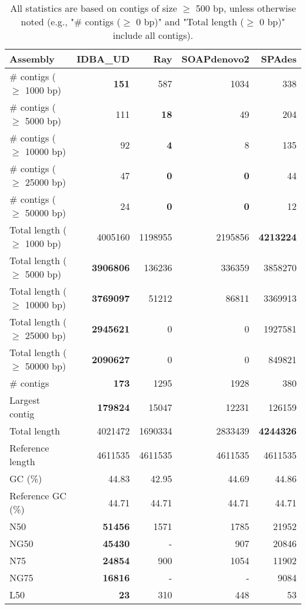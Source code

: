 \documentclass[12pt,a4paper]{article}
\begin{document}
\begin{table}[ht]
\begin{center}
\caption{All statistics are based on contigs of size $\geq$ 500 bp, unless otherwise noted (e.g., "\# contigs ($\geq$ 0 bp)" and "Total length ($\geq$ 0 bp)" include all contigs).}
\begin{tabular}{|l*{4}{|r}|}
\hline
Assembly & IDBA\_UD & Ray & SOAPdenovo2 & SPAdes \\ \hline
\# contigs ($\geq$ 1000 bp) & {\bf 151} & 587 & 1034 & 338 \\ \hline
\# contigs ($\geq$ 5000 bp) & 111 & {\bf 18} & 49 & 204 \\ \hline
\# contigs ($\geq$ 10000 bp) & 92 & {\bf 4} & 8 & 135 \\ \hline
\# contigs ($\geq$ 25000 bp) & 47 & {\bf 0} & {\bf 0} & 44 \\ \hline
\# contigs ($\geq$ 50000 bp) & 24 & {\bf 0} & {\bf 0} & 12 \\ \hline
Total length ($\geq$ 1000 bp) & 4005160 & 1198955 & 2195856 & {\bf 4213224} \\ \hline
Total length ($\geq$ 5000 bp) & {\bf 3906806} & 136236 & 336359 & 3858270 \\ \hline
Total length ($\geq$ 10000 bp) & {\bf 3769097} & 51212 & 86811 & 3369913 \\ \hline
Total length ($\geq$ 25000 bp) & {\bf 2945621} & 0 & 0 & 1927581 \\ \hline
Total length ($\geq$ 50000 bp) & {\bf 2090627} & 0 & 0 & 849821 \\ \hline
\# contigs & {\bf 173} & 1295 & 1928 & 380 \\ \hline
Largest contig & {\bf 179824} & 15047 & 12231 & 126159 \\ \hline
Total length & 4021472 & 1690334 & 2833439 & {\bf 4244326} \\ \hline
Reference length & 4611535 & 4611535 & 4611535 & 4611535 \\ \hline
GC (\%) & 44.83 & 42.95 & 44.69 & 44.86 \\ \hline
Reference GC (\%) & 44.71 & 44.71 & 44.71 & 44.71 \\ \hline
N50 & {\bf 51456} & 1571 & 1785 & 21952 \\ \hline
NG50 & {\bf 45430} & - & 907 & 20846 \\ \hline
N75 & {\bf 24854} & 900 & 1054 & 11902 \\ \hline
NG75 & {\bf 16816} & - & - & 9084 \\ \hline
L50 & {\bf 23} & 310 & 448 & 53 \\ \hline

\end{tabular}
\end{center}
\end{table}
\end{document}
